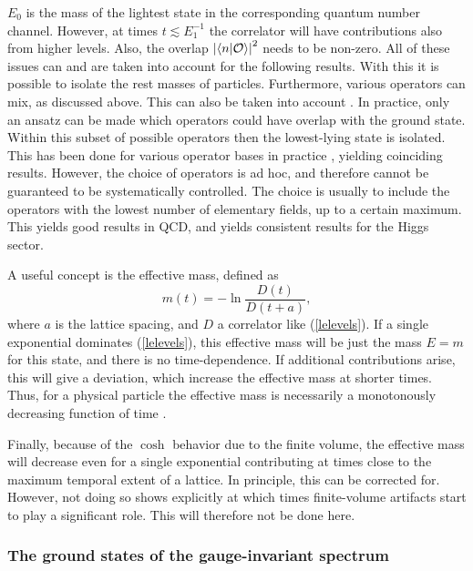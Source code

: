 \documentclass[final,12pt]{article}
\newcommand*{\no}{\noindent}
\newcommand*{\be}{\begin{equation}}
\newcommand*{\ee}{\end{equation}}
\newcommand*{\pref}[1]{(\ref{#1})}
\newcommand*{\1}{1\!\!\!\bot}
\newcommand*{\la}{\left\langle}
\newcommand*{\ra}{\right\rangle}
\newcommand*{\op}{{\cal O}}
\begin{document}
$E_0$ is the mass of the lightest state in the corresponding quantum number channel. However, at times $t\lesssim E_1^{-1}$ the correlator will have contributions also from higher levels. Also, the overlap $\left|\la n|\op\ra\right|^2$ needs to be non-zero. All of these issues can \cite{Gattringer:2010zz} and are taken into account \cite{Wurtz:2013ova,Maas:2013aia,Maas:2014pba} for the following results. With this it is possible to isolate the rest masses of particles. Furthermore, various operators can mix, as discussed above. This can also be taken into account \cite{Gattringer:2010zz}. In practice, only an ansatz can be made which operators could have overlap with the ground state. Within this subset of possible operators then the lowest-lying state is isolated. This has been done for various operator bases in practice \cite{Wurtz:2013ova,Maas:2013aia,Maas:2014pba}, yielding coinciding results. However, the choice of operators is ad hoc, and therefore cannot be guaranteed to be systematically controlled. The choice is usually to include the operators with the lowest number of elementary fields, up to a certain maximum. This yields good results in QCD, and yields consistent results for the Higgs sector.

A useful concept is the effective mass, defined as \cite{Maas:2011se,Gattringer:2010zz,Montvay:1994cy}
\be
m(t)=-\ln\frac{D(t)}{D(t+a)}\label{effmass},
\ee
\no where $a$ is the lattice spacing, and $D$ a correlator like \pref{lelevels}. If a single exponential dominates \pref{lelevels}, this effective mass will be just the mass $E=m$ for this state, and there is no time-dependence. If additional contributions arise, this will give a deviation, which increase the effective mass at shorter times. Thus, for a physical particle the effective mass is necessarily a monotonously decreasing function of time \cite{Seiler:1982pw}.

Finally, because of the $\cosh$ behavior due to the finite volume, the effective mass will decrease even for a single exponential contributing at times close to the maximum temporal extent of a lattice. In principle, this can be corrected for. However, not doing so shows explicitly at which times finite-volume artifacts start to play a significant role. This will therefore not be done here. 

\subsubsection{The ground states of the gauge-invariant spectrum}\label{sss:ground}
\end{document}
